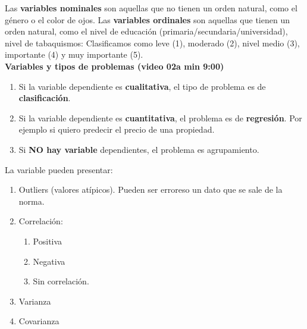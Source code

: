 \documentclass[../main.tex]{subfiles}
\begin{document}
    Las \textbf{variables nominales} son aquellas que no tienen un orden natural, como el género o el color de ojos. Las \textbf{variables ordinales} son aquellas que tienen un orden natural, como el nivel de educación (primaria/secundaria/universidad), nivel de tabaquismos: Clasificamos como leve (1), moderado (2), nivel medio (3), importante (4) y muy importante (5).\\
		 
     \textbf{Variables y tipos de problemas (video 02a min 9:00)}
     \begin{enumerate}
        \item 
            Si la variable dependiente es \textbf{cualitativa}, el tipo de problema es de \textbf{clasificación}. 
        \item 
            Si la variable dependiente es \textbf{cuantitativa}, el problema es de \textbf{regresión}.
            Por ejemplo si quiero predecir el precio de una propiedad.
        \item 
            Si \textbf{NO hay variable} dependientes, el problema es agrupamiento.
     \end{enumerate}
	 
    La variable pueden presentar:
    \begin{enumerate}
        \item Outliers (valores atípicos). Pueden ser erroreso un dato que se sale de la norma.
        \item Correlación:
            \begin{enumerate}
                \item Positiva
                \item Negativa
                \item Sin correlación.
            \end{enumerate}
        \item Varianza
        \item Covarianza
    \end{enumerate}

	
\end{document}
